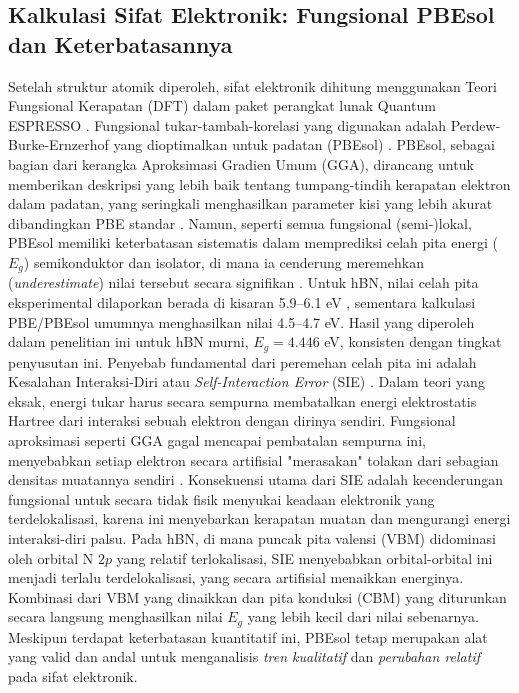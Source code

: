 \subsection{Kalkulasi Sifat Elektronik: Fungsional PBEsol dan Keterbatasannya}
\label{subsec:dft_qe}
Setelah struktur atomik diperoleh, sifat elektronik dihitung menggunakan Teori Fungsional Kerapatan (DFT) \citep{Hohenberg1964, Kohn1965} dalam paket perangkat lunak Quantum ESPRESSO \citep{Giannozzi2009, Giannozzi2017}.
Fungsional tukar-tambah-korelasi yang digunakan adalah Perdew-Burke-Ernzerhof yang dioptimalkan untuk padatan (PBEsol) \citep{Perdew2008}.
PBEsol, sebagai bagian dari kerangka Aproksimasi Gradien Umum (GGA), dirancang untuk memberikan deskripsi yang lebih baik tentang tumpang-tindih kerapatan elektron dalam padatan, yang seringkali menghasilkan parameter kisi yang lebih akurat dibandingkan PBE standar \citep{Perdew2008}.
Namun, seperti semua fungsional (semi-)lokal, PBEsol memiliki keterbatasan sistematis dalam memprediksi celah pita energi ($E_g$) semikonduktor dan isolator, di mana ia cenderung meremehkan (\emph{underestimate}) nilai tersebut secara signifikan \citep{perdew2005}.
Untuk hBN, nilai celah pita eksperimental dilaporkan berada di kisaran 5.9–6.1 eV \citep{Watanabe2004, Elias2019}, sementara kalkulasi PBE/PBEsol umumnya menghasilkan nilai 4.5–4.7 eV.
Hasil yang diperoleh dalam penelitian ini untuk hBN murni, $E_g = 4.446$ eV, konsisten dengan tingkat penyusutan ini.
Penyebab fundamental dari peremehan celah pita ini adalah Kesalahan Interaksi-Diri atau \emph{Self-Interaction Error} (SIE) \citep{perdew1981}.
Dalam teori yang eksak, energi tukar harus secara sempurna membatalkan energi elektrostatis Hartree dari interaksi sebuah elektron dengan dirinya sendiri.
Fungsional aproksimasi seperti GGA gagal mencapai pembatalan sempurna ini, menyebabkan setiap elektron secara artifisial "merasakan" tolakan dari sebagian densitas muatannya sendiri \citep{MoriSanchez2008}.
Konsekuensi utama dari SIE adalah kecenderungan fungsional untuk secara tidak fisik menyukai keadaan elektronik yang terdelokalisasi, karena ini menyebarkan kerapatan muatan dan mengurangi energi interaksi-diri palsu.
Pada hBN, di mana puncak pita valensi (VBM) didominasi oleh orbital N $2p$ yang relatif terlokalisasi, SIE menyebabkan orbital-orbital ini menjadi terlalu terdelokalisasi, yang secara artifisial menaikkan energinya.
Kombinasi dari VBM yang dinaikkan dan pita konduksi (CBM) yang diturunkan secara langsung menghasilkan nilai $E_g$ yang lebih kecil dari nilai sebenarnya.
Meskipun terdapat keterbatasan kuantitatif ini, PBEsol tetap merupakan alat yang valid dan andal untuk menganalisis \emph{tren kualitatif} dan \emph{perubahan relatif} pada sifat elektronik.

